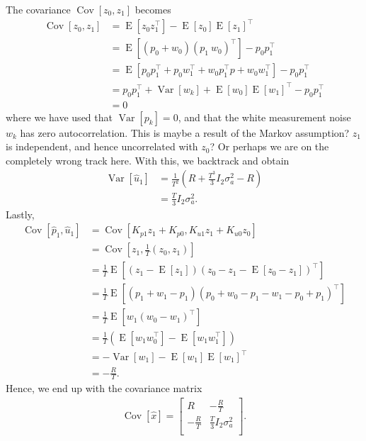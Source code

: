 \documentclass[]{article}
\DeclareMathOperator{\Var}{\text{Var}}
\DeclareMathOperator{\Cov}{\text{Cov}}
\DeclareMathOperator{\E}{\text{E}}
\begin{document}
The covariance $\Cov[z_0, z_1]$ becomes
\begin{equation}\begin{aligned}
\Cov[z_0, z_1]
&= \E[z_0 z_1^\top] - \E [z_0] \E [z_1]^\top \\
&= \E[(p_0 + w_0)(p_1 \ w_0)^\top] - p_0 p_1 ^\top \\
&= \E[p_0 p_1^\top + p_0 w_1^\top + w_0 p_1^\top p + w_0w_1^\top] - p_0 p_1^\top \\
&= p_0 p_1^\top + \Var[w_k] + \E[w_0]\E[w_1]^\top  - p_0 p_1^\top \\
&= 0
\end{aligned}\end{equation}
where we have used that $\Var[p_k] = 0$, and that the white measurement noise $w_k$ has zero autocorrelation. This is maybe a result of the Markov assumption? $z_1$ is independent, and hence uncorrelated with $z_0$? Or perhaps we are on the completely wrong track here. With this, we backtrack and obtain
\begin{equation}\begin{aligned}
\Var[\hat u_1] &= \frac{1}{T^2}(R + \frac{T^3}{3}I_2 \sigma_a^2 - R) \\
&= \frac{T}{3}I_2 \sigma_a^2.
\end{aligned}\end{equation}
Lastly,
\begin{equation}\begin{aligned}
\Cov[\hat p_1, \hat u_1] &= \Cov[K_{p1} z_1 + K_{p0}, K_{u1} z_1 + K_{u0} z_0] \\
&= \Cov[z_1, \frac{1}{T}(z_0, z_1)] \\
&= \frac{1}{T}\E[(z_1-\E[z_1])(z_0-z_1 - \E[z_0-z_1])^\top] \\
&= \frac{1}{T}\E[(p_1 + w_1 - p_1)(p_0 + w_0 - p_1 - w_1 - p_0 + p_1)^\top] \\
&= \frac{1}{T}\E[w_1(w_0 - w_1)^\top] \\
&= \frac{1}{T}(\E[w_1w_0^\top] - \E[w_1w_1^\top]) \\
&= -\Var[w_1] - \E[w_1]\E[w_1]^\top \\
&= -\frac{R}{T}.
\end{aligned}\end{equation}
Hence, we end up with the covariance matrix
\begin{equation}\begin{aligned}
\label{eq:x_1_hat_cov}
\Cov[\hat x] =
\begin{bmatrix}
R & -\frac{R}{T} \\
-\frac{R}{T} & \frac{T}{3}I_2 \sigma_a^2 \\
\end{bmatrix}.
\end{aligned}\end{equation}
\end{document}
